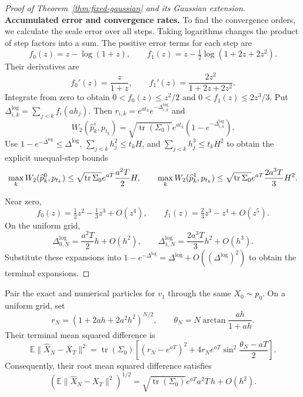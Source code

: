 \begin{proof}[Proof of Theorem~\ref{thm:fixed-gaussian} and its Gaussian extension]
\textbf{Accumulated error and convergence rates.}\quad
To find the convergence orders, we calculate the scale error over all steps. Taking logarithms changes the product of step factors into a sum. The positive error terms for each step are
\[
 f_0(z)=z-\log(1+z),\qquad
 f_1(z)=z-\tfrac12\log(1+2z+2z^2).
\]
Their derivatives are
\[
 f_0'(z)=\frac{z}{1+z},\qquad
 f_1'(z)=\frac{2z^2}{1+2z+2z^2}.
\]
Integrate from zero to obtain
$0<f_0(z)\le z^2/2$ and $0<f_1(z)\le2z^3/3$.
Put $\Delta^{\mathrm{log}}_{i,k}=\sum_{j<k}f_i(ah_j)$.
Then $r_{i,k}=e^{at_k}e^{-\Delta^{\mathrm{log}}_{i,k}}$ and
\[
 W_2(\widehat p^i_k,p_{t_k})
 =\sqrt{\operatorname{tr}(\Sigma_0)}e^{at_k}(1-e^{-\Delta^{\mathrm{log}}_{i,k}}).
\]
Use $1-e^{-\Delta^{\mathrm{log}}}\le \Delta^{\mathrm{log}}$, $\sum_{j<k}h_j^2\le t_kH$, and
$\sum_{j<k}h_j^3\le t_kH^2$ to obtain the explicit unequal-step bounds
\[
 \max_kW_2(\widehat p_k^0,p_{t_k})
 \le\sqrt{\operatorname{tr}\Sigma_0}e^{aT}\frac{a^2T}{2}H,
 \qquad
 \max_kW_2(\widehat p_k^1,p_{t_k})
 \le\sqrt{\operatorname{tr}\Sigma_0}e^{aT}\frac{2a^3T}{3}H^2.
\]

Near zero,
\[
 f_0(z)=\tfrac12z^2-\tfrac13z^3+O(z^4),\qquad
 f_1(z)=\tfrac23z^3-z^4+O(z^5).
\]
On the uniform grid,
\[
 \Delta^{\mathrm{log}}_{0,N}=\frac{a^2T}{2}h+O(h^2),\qquad
 \Delta^{\mathrm{log}}_{1,N}=\frac{2a^3T}{3}h^2+O(h^3).
\]
Substitute these expansions into $1-e^{-\Delta^{\mathrm{log}}}=\Delta^{\mathrm{log}}+O((\Delta^{\mathrm{log}})^2)$ to obtain the terminal expansions.
\end{proof}

\begin{proposition}
\label{prop:gaussian-particle-error}
Pair the exact and numerical particles for $v_1$ through the same
$X_0\sim p_0$. On a uniform grid, set
\[
 r_N=(1+2ah+2a^2h^2)^{N/2},\qquad
 \theta_N=N\arctan\frac{ah}{1+ah}.
\]
Their terminal mean squared difference is
\[
 \mathbb E\|\widehat X_N-X_T\|^2
 =\operatorname{tr}(\Sigma_0)
 \left[(r_N-e^{aT})^2
       +4r_Ne^{aT}\sin^2\frac{\theta_N-aT}{2}\right].
\]
Consequently, their root mean squared difference satisfies
\[
 \left(\mathbb E\|\widehat X_N-X_T\|^2\right)^{1/2}
 =\sqrt{\operatorname{tr}(\Sigma_0)}e^{aT}a^2T\,h+O(h^2).
\]
\end{proposition}

